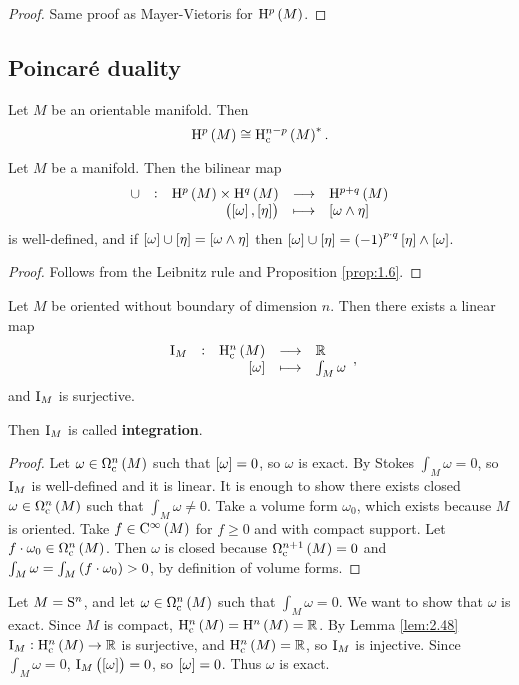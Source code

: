 \begin{proof}
Same proof as Mayer-Vietoris for $ \H^p\br{M} $.
\end{proof}

\subsection{Poincar\'e duality}

Let $ M $ be an orientable manifold. Then
$$ \H^p\br{M} \cong \H_\c^{n - p}\br{M}^*. $$

\begin{proposition}
Let $ M $ be a manifold. Then the bilinear map
$$ \function[\cup]{\H^p\br{M} \times \H^q\br{M}}{\H^{p + q}\br{M}}{\br{\sbr{\omega}, \sbr{\eta}}}{\sbr{\omega \wedge \eta}} $$
is well-defined, and if $ \sbr{\omega} \cup \sbr{\eta} = \sbr{\omega \wedge \eta} $ then $ \sbr{\omega} \cup \sbr{\eta} = \br{-1}^{p \cdot q}\sbr{\eta} \wedge \sbr{\omega} $.
\end{proposition}

\begin{proof}
Follows from the Leibnitz rule and Proposition \ref{prop:1.6}.
\end{proof}

\pagebreak

\begin{lemma}
\label{lem:2.48}
Let $ M $ be oriented without boundary of dimension $ n $. Then there exists a linear map
$$ \function[\I_M]{\H_\c^n\br{M}}{\RR}{\sbr{\omega}}{\int_M \omega}, $$
and $ \I_M $ is surjective.
\end{lemma}

Then $ \I_M $ is called \textbf{integration}.

\begin{proof}
Let $ \omega \in \Omega_\c^n\br{M} $ such that $ \sbr{\omega} = 0 $, so $ \omega $ is exact. By Stokes $ \int_M \omega = 0 $, so $ \I_M $ is well-defined and it is linear. It is enough to show there exists closed $ \omega \in \Omega_\c^n\br{M} $ such that $ \int_M \omega \ne 0 $. Take a volume form $ \omega_0 $, which exists because $ M $ is oriented. Take $ f \in \C^\infty\br{M} $ for $ f \ge 0 $ and with compact support. Let $ f \cdot \omega_0 \in \Omega_\c^n\br{M} $. Then $ \omega $ is closed because $ \Omega_\c^{n + 1}\br{M} = 0 $ and $ \int_M \omega = \int_M \br{f \cdot \omega_0} > 0 $, by definition of volume forms.
\end{proof}

\begin{example}
Let $ M = \S^n $, and let $ \omega \in \Omega_\c^n\br{M} $ such that $ \int_M \omega = 0 $. We want to show that $ \omega $ is exact. Since $ M $ is compact, $ \H_\c^n\br{M} = \H^n\br{M} = \RR $. By Lemma \ref{lem:2.48} $ \I_M : \H_\c^n\br{M} \to \RR $ is surjective, and $ \H_\c^n\br{M} = \RR $, so $ \I_M $ is injective. Since $ \int_M \omega = 0 $, $ \I_M\br{\sbr{\omega}} = 0 $, so $ \sbr{\omega} = 0 $. Thus $ \omega $ is exact.
\end{example}

